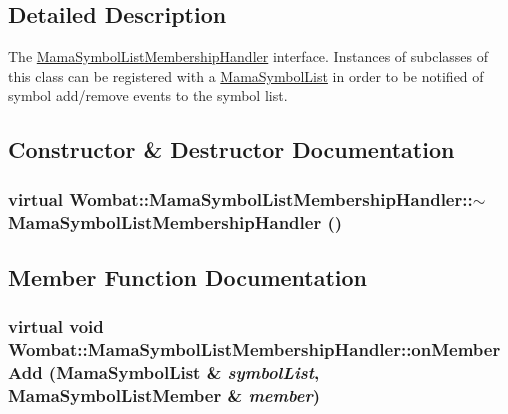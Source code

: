 \subsection{Detailed Description}
The \hyperlink{classWombat_1_1MamaSymbolListMembershipHandler}{MamaSymbolListMembershipHandler} interface. Instances of subclasses of this class can be registered with a \hyperlink{classWombat_1_1MamaSymbolList}{MamaSymbolList} in order to be notified of symbol add/remove events to the symbol list. 

\subsection{Constructor \& Destructor Documentation}
\hypertarget{classWombat_1_1MamaSymbolListMembershipHandler_aba263b5f66a1c8fbc4fcf1d49f76ffed}{
\subsubsection[{$\sim$MamaSymbolListMembershipHandler}]{\setlength{\rightskip}{0pt plus 5cm}virtual Wombat::MamaSymbolListMembershipHandler::$\sim$MamaSymbolListMembershipHandler ()}}
\label{classWombat_1_1MamaSymbolListMembershipHandler_aba263b5f66a1c8fbc4fcf1d49f76ffed}


\subsection{Member Function Documentation}
\hypertarget{classWombat_1_1MamaSymbolListMembershipHandler_a6477fc850b111a96245aa45bc12d8c4c}{
\subsubsection[{onMemberAdd}]{\setlength{\rightskip}{0pt plus 5cm}virtual void Wombat::MamaSymbolListMembershipHandler::onMemberAdd ({\bf MamaSymbolList} \& {\em symbolList}, \/  {\bf MamaSymbolListMember} \& {\em member})}}
\label{classWombat_1_1MamaSymbolListMembershipHandler_a6477fc850b111a96245aa45bc12d8c4c}


